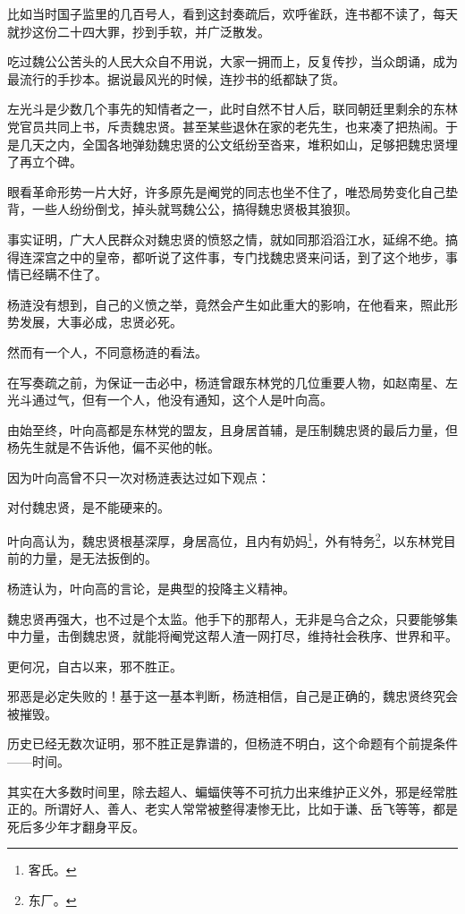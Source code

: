 \begin{multicols}{\theparacolNo}
		比如当时国子监里的几百号人，看到这封奏疏后，欢呼雀跃，连书都不读了，每天就抄这份二十四大罪，抄到手软，并广泛散发。

		吃过魏公公苦头的人民大众自不用说，大家一拥而上，反复传抄，当众朗诵，成为最流行的手抄本。据说最风光的时候，连抄书的纸都缺了货。

		左光斗是少数几个事先的知情者之一，此时自然不甘人后，联同朝廷里剩余的东林党官员共同上书，斥责魏忠贤。甚至某些退休在家的老先生，也来凑了把热闹。于是几天之内，全国各地弹劾魏忠贤的公文纸纷至沓来，堆积如山，足够把魏忠贤埋了再立个碑。

		眼看革命形势一片大好，许多原先是阉党的同志也坐不住了，唯恐局势变化自己垫背，一些人纷纷倒戈，掉头就骂魏公公，搞得魏忠贤极其狼狈。

		事实证明，广大人民群众对魏忠贤的愤怒之情，就如同那滔滔江水，延绵不绝。搞得连深宫之中的皇帝，都听说了这件事，专门找魏忠贤来问话，到了这个地步，事情已经瞒不住了。

		杨涟没有想到，自己的义愤之举，竟然会产生如此重大的影响，在他看来，照此形势发展，大事必成，忠贤必死。

		然而有一个人，不同意杨涟的看法。

		在写奏疏之前，为保证一击必中，杨涟曾跟东林党的几位重要人物，如赵南星、左光斗通过气，但有一个人，他没有通知，这个人是叶向高。

		由始至终，叶向高都是东林党的盟友，且身居首辅，是压制魏忠贤的最后力量，但杨先生就是不告诉他，偏不买他的帐。

		因为叶向高曾不只一次对杨涟表达过如下观点：

		对付魏忠贤，是不能硬来的。

		叶向高认为，魏忠贤根基深厚，身居高位，且内有奶妈\footnote{客氏。}，外有特务\footnote{东厂。}，以东林党目前的力量，是无法扳倒的。

		杨涟认为，叶向高的言论，是典型的投降主义精神。

		魏忠贤再强大，也不过是个太监。他手下的那帮人，无非是乌合之众，只要能够集中力量，击倒魏忠贤，就能将阉党这帮人渣一网打尽，维持社会秩序、世界和平。

		更何况，自古以来，邪不胜正。

		邪恶是必定失败的！基于这一基本判断，杨涟相信，自己是正确的，魏忠贤终究会被摧毁。

		历史已经无数次证明，邪不胜正是靠谱的，但杨涟不明白，这个命题有个前提条件——时间。

		其实在大多数时间里，除去超人、蝙蝠侠等不可抗力出来维护正义外，邪是经常胜正的。所谓好人、善人、老实人常常被整得凄惨无比，比如于谦、岳飞等等，都是死后多少年才翻身平反。


\end{multicols}
